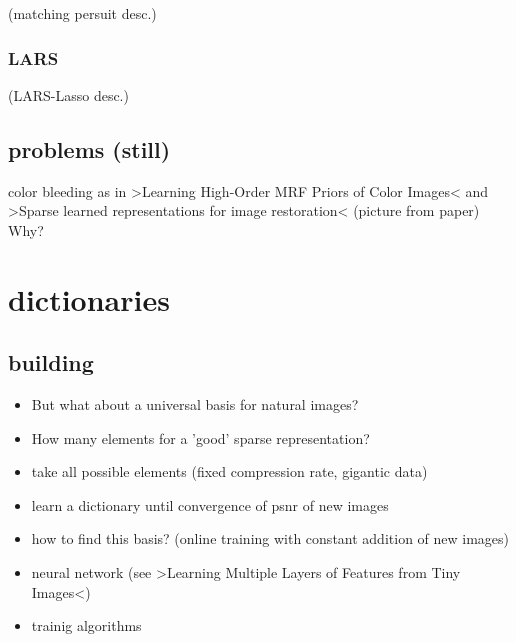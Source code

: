 \begin{frame}
(matching persuit desc.)
\end{frame}

\subsubsection*{LARS}
\begin{frame}
(LARS-Lasso desc.)
\end{frame}



\subsection{problems (still)}
\begin{frame}
color bleeding as in >Learning High-Order MRF Priors of Color Images< and >Sparse learned representations for image restoration<
(picture from paper)
Why?
\end{frame}

\section{dictionaries}
\subsection{building}
\begin{frame}
\begin{itemize}
\item But what about a universal basis for natural images? 
\item How many elements for a 'good' sparse representation?
\item take all possible elements (fixed compression rate, gigantic data)
\item learn a dictionary until convergence of psnr of new images
\item how to find this basis? (online training with constant addition of new images)
\end{itemize}
\end{frame}

\begin{frame}
\begin{itemize}
\item neural network (see >Learning Multiple Layers of Features from Tiny Images<)
\item trainig algorithms
\end{itemize}
\end{frame}

